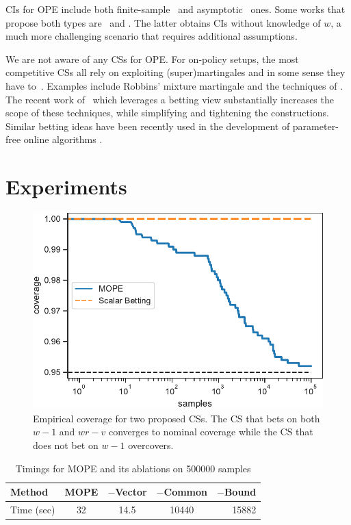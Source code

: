 CIs for OPE include both finite-sample~\cite{thomas2015high} and
asymptotic~\cite{li2015counterfactual,karampatziakis2019empirical} ones. Some
works that propose both types are~\cite{bottou2013counterfactual} and
\cite{dai2020coindice}. The latter obtains CIs without knowledge of $w$, a much
more challenging scenario that requires additional assumptions.

We are not aware of any CSs for OPE.  For on-policy setups, the most
competitive CSs all rely on exploiting (super)martingales and in some sense
they have to~\cite{ramdas2020admissible}.  Examples include Robbins' mixture
martingale \cite{robbins_statistical_1970} and the techniques of
\cite{howard_uniform_2019}. The recent work
of~\cite{waudby-smith_variance-adaptive_2020} which 
leverages a betting view substantially
increases the scope of these techniques, while
simplifying and tightening the constructions. Similar betting 
ideas have been recently used in the development of 
parameter-free online algorithms \cite{OrabonaP16}.

\section{Experiments}

\begin{figure}
    \centering
    \includegraphics[width=0.75\linewidth]{coverage}
    \caption{Empirical coverage for two proposed CSs. The CS that bets on 
    both $w-1$ and $wr-v$ converges to nominal coverage while the CS
    that does not bet on $w-1$ overcovers.}
    \label{fig:coverage}
\end{figure}

\begin{table}
\caption{Timings for MOPE and its ablations on 500000 samples}
\label{tab:timings}
\centering
\begin{small}
\begin{sc}
\begin{tabular}{lcccr}
\toprule
Method & MOPE & $-$Vector & $-$Common & $-$Bound \\
\midrule
Time (sec)& 32     & 14.5  & 10440 & 15882 \\
\bottomrule
\end{tabular}
\end{sc}
\end{small}
\end{table}

